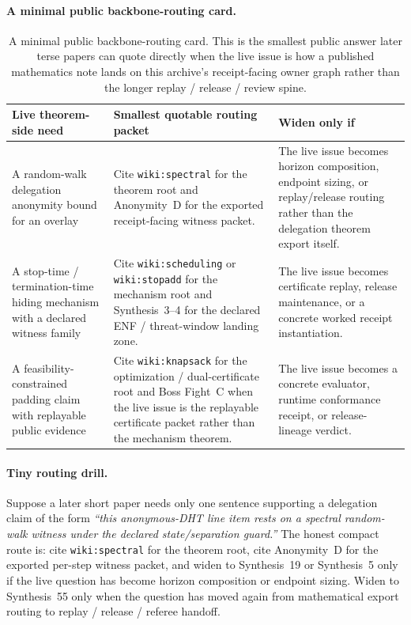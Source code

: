 \documentclass[11pt]{article}
\begin{document}
\paragraph{A minimal public backbone-routing card.}
\begin{table}[t]
\centering
\small
\begin{tabularx}{\linewidth}{@{}lX X@{}}
\toprule
Live theorem-side need & Smallest quotable routing packet & Widen only if \\
\midrule
A random-walk delegation anonymity bound for an overlay & Cite \texttt{wiki:spectral} for the theorem root and Anonymity~D for the exported receipt-facing witness packet. & The live issue becomes horizon composition, endpoint sizing, or replay/release routing rather than the delegation theorem export itself. \\
A stop-time / termination-time hiding mechanism with a declared witness family & Cite \texttt{wiki:scheduling} or \texttt{wiki:stopadd} for the mechanism root and Synthesis~3--4 for the declared ENF / threat-window landing zone. & The live issue becomes certificate replay, release maintenance, or a concrete worked receipt instantiation. \\
A feasibility-constrained padding claim with replayable public evidence & Cite \texttt{wiki:knapsack} for the optimization / dual-certificate root and Boss Fight~C when the live issue is the replayable certificate packet rather than the mechanism theorem. & The live issue becomes a concrete evaluator, runtime conformance receipt, or release-lineage verdict. \\
\bottomrule
\end{tabularx}
\caption{A minimal public backbone-routing card. This is the smallest public answer later terse papers can quote directly when the live issue is how a published mathematics note lands on this archive's receipt-facing owner graph rather than the longer replay / release / review spine.}
\label{tab:mathcrosswalk-mincard}
\end{table}

\paragraph{Tiny routing drill.}
Suppose a later short paper needs only one sentence supporting a delegation claim of the form \emph{``this anonymous-DHT line item rests on a spectral random-walk witness under the declared state/separation guard.''} The honest compact route is: cite \texttt{wiki:spectral} for the theorem root, cite Anonymity~D for the exported per-step witness packet, and widen to Synthesis~19 or Synthesis~5 only if the live question has become horizon composition or endpoint sizing. Widen to Synthesis~55 only when the question has moved again from mathematical export routing to replay / release / referee handoff.
\end{document}
